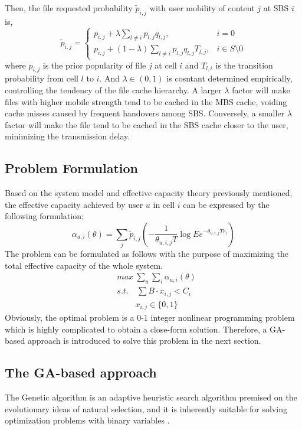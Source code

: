 \documentclass[conference]{IEEEtran}
\begin{document}
Then, the file requested probability ${\tilde{p}_{i,j}}$ with user mobility of content $j$ at SBS $i$ is,
\begin{equation}
{\tilde{p}_{i,j}}=
\begin{cases}
p_{i,j}+\lambda\sum_{l\neq i}p_{l,j}q_{l,j},  & i=0\\
p_{i,j}+(1-\lambda)\sum_{l\neq i}p_{l,j}q_{l,j}T_{l,j}, & i\in S\setminus 0
\end{cases}
\end{equation}
where $p_{i,j}$ is the prior popularity of file $j$ at cell $i$ and $T_{l,i}$ is the transition probability from cell $l$ to $i$. And $\lambda\in(0,1)$ is cosntant determined empirically, controlling the tendency of the file cache hierarchy. A larger $\lambda$ factor will make files with higher mobile strength tend to be cached in the MBS cache, voiding cache misses caused by frequent handovers among SBS. Conversely, a smaller $\lambda$ factor will make the file tend to be cached in the SBS cache closer to the user, minimizing the transmission delay.

\subsection{Problem Formulation}
Based on the system model and effective capacity theory previously mentioned, the effective capacity achieved by user $u$ in cell $i$ can be expressed by the following formulation:
\begin{equation}
\alpha_{u,i}(\theta)=\sum_j{\tilde{p}_{i,j}}(-\frac{1}{\theta_{u,i,j}T}\log Ee^{-\theta_{u,i,j}Tr_i})
\end{equation}
The problem can be formulated as follows with the purpose of maximizing the total effective capacity of the whole system.
\begin{equation}
 \begin{aligned}
   & {max}\ \sum_u\sum_i\alpha_{u,i}(\theta)\\
   & s.t. \quad\sum B\cdot x_{i,j}<C_i\\
   & \qquad \ x_{i,j}\in\{0,1\}
 \end{aligned}
\end{equation}
Obviously, the optimal problem is a 0-1 integer nonlinear programming problem which is highly complicated to obtain a close-form solution. Therefore, a GA-based approach is introduced to solve this problem in the next section.

\subsection{The GA-based approach}
The Genetic algorithm is an adaptive heuristic search algorithm premised on the evolutionary ideas of natural selection, and it is inherently suitable for solving optimization problems with binary variables \cite{Srinivas2002Genetic}.
\end{document}

